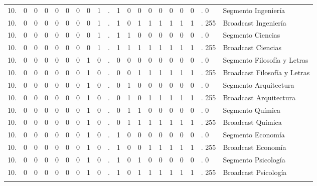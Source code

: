 \begin{center}
{\begin{tabular}{r cccccccc c cccccccc l l}
10. & 0 & 0 & 0 & 0 & 0 & 0 & 0 & 1 & . & 1 & \multicolumn{1}{c|}{0} & 0 & 0 & 0 & 0 & 0 & 0 & . 0 & Segmento Ingeniería \\
10. & 0 & 0 & 0 & 0 & 0 & 0 & 0 & 1 & . & 1 & \multicolumn{1}{c|}{0} & 1 & 1 & 1 & 1 & 1 & 1 & . 255 & Broadcast Ingeniería \\
\addlinespace

10. & 0 & 0 & 0 & 0 & 0 & 0 & 0 & 1 & . & 1 & \multicolumn{1}{c|}{1} & 0 & 0 & 0 & 0 & 0 & 0 & . 0 & Segmento Ciencias \\
10. & 0 & 0 & 0 & 0 & 0 & 0 & 0 & 1 & . & 1 & \multicolumn{1}{c|}{1} & 1 & 1 & 1 & 1 & 1 & 1 & . 255 & Broadcast Ciencias \\
\addlinespace

10. & 0 & 0 & 0 & 0 & 0 & 0 & 1 & 0 & . & 0 & \multicolumn{1}{c|}{0} & 0 & 0 & 0 & 0 & 0 & 0 & . 0 & Segmento Filosofía y Letras \\
10. & 0 & 0 & 0 & 0 & 0 & 0 & 1 & 0 & . & 0 & \multicolumn{1}{c|}{0} & 1 & 1 & 1 & 1 & 1 & 1 & . 255 & Broadcast Filosofía y Letras \\
\addlinespace

10. & 0 & 0 & 0 & 0 & 0 & 0 & 1 & 0 & . & 0 & 1 & \multicolumn{1}{c|}{0} & 0 & 0 & 0 & 0 & 0 & . 0 & Segmento Arquitectura \\
10. & 0 & 0 & 0 & 0 & 0 & 0 & 1 & 0 & . & 0 & 1 & \multicolumn{1}{c|}{0} & 1 & 1 & 1 & 1 & 1 & . 255 & Broadcast Arquitectura \\
\addlinespace

10. & 0 & 0 & 0 & 0 & 0 & 0 & 1 & 0 & . & 0 & 1 & \multicolumn{1}{c|}{1} & 0 & 0 & 0 & 0 & 0 & . 0 & Segmento Química \\
10. & 0 & 0 & 0 & 0 & 0 & 0 & 1 & 0 & . & 0 & 1 & \multicolumn{1}{c|}{1} & 1 & 1 & 1 & 1 & 1 & . 255 & Broadcast Química \\
\addlinespace

10. & 0 & 0 & 0 & 0 & 0 & 0 & 1 & 0 & . & 1 & 0 & \multicolumn{1}{c|}{0} & 0 & 0 & 0 & 0 & 0 & . 0 & Segmento Economía \\
10. & 0 & 0 & 0 & 0 & 0 & 0 & 1 & 0 & . & 1 & 0 & \multicolumn{1}{c|}{0} & 1 & 1 & 1 & 1 & 1 & . 255 & Broadcast Economía \\
\addlinespace

10. & 0 & 0 & 0 & 0 & 0 & 0 & 1 & 0 & . & 1 & 0 & \multicolumn{1}{c|}{1} & 0 & 0 & 0 & 0 & 0 & . 0 & Segmento Psicología \\
10. & 0 & 0 & 0 & 0 & 0 & 0 & 1 & 0 & . & 1 & 0 & \multicolumn{1}{c|}{1} & 1 & 1 & 1 & 1 & 1 & . 255 & Broadcast Psicología \\
\addlinespace


\end{tabular}}
\end{center}

